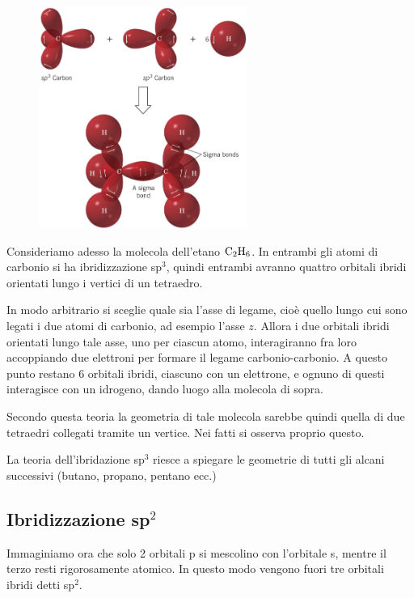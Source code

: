 \vspace{-0.6cm}\hspace{0.5cm}\begin{minipage}{0.2\textwidth}
    \begin{figure}[H]
        \includegraphics[width=6.8cm]{immagini/etano.png}
    \end{figure}
\end{minipage} \hfill
\begin{minipage}{0.5\textwidth}
    \vspace{1cm}Consideriamo adesso la molecola dell'etano $\rm C_2H_6$. In entrambi gli atomi di carbonio si ha ibridizzazione sp$^3$, quindi entrambi avranno quattro orbitali ibridi orientati lungo i vertici di un tetraedro.

    In modo arbitrario si sceglie quale sia l'asse di legame, cioè quello lungo cui sono legati i due atomi di carbonio, ad esempio l'asse $z$. Allora i due orbitali ibridi orientati lungo tale asse, uno per ciascun atomo, interagiranno fra loro accoppiando due elettroni per formare il legame carbonio-carbonio. A questo punto restano 6 orbitali ibridi, ciascuno con un elettrone, e ognuno di questi interagisce con un idrogeno, dando luogo alla molecola di sopra.
    
    Secondo questa teoria la geometria di tale molecola sarebbe quindi quella di due tetraedri collegati tramite un vertice. Nei fatti si osserva proprio questo.
\end{minipage}

\vspace{0.2cm}La teoria dell'ibridazione sp$^3$ riesce a spiegare le geometrie di tutti gli alcani successivi (butano, propano, pentano ecc.)

\subsection{Ibridizzazione sp$^2$}
Immaginiamo ora che solo 2 orbitali p si mescolino con l'orbitale s, mentre il terzo resti rigorosamente atomico. In questo modo vengono fuori tre orbitali ibridi detti sp$^2$.

